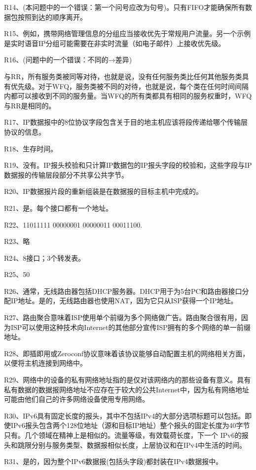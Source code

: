 \documentclass[11pt,UTF8,twoside]{article}
\begin{document}
	R14、(本问题中的一个错误：第一个问号应改为句号)。只有FIFO才能确保所有数据包按照到达的顺序离开。
	
	R15、例如，携带网络管理信息的分组应当接收优先于常规用户流量。另一个示例是实时语音IP分组可能需要在非实时流量（如电子邮件）上接收优先级。
	
	R16、(问题中的一个错误：不同的→差异)
	
	与RR，所有服务类被同等对待，也就是说，没有任何服务类比任何其他服务类具有优先级。对于WFQ，服务类被不同的对待，也就是说，每个类在任何时间间隔内都可以接收到不同的服务量。当WFQ的所有类都具有相同的服务权重时，WFQ与RR是相同的。
	
	R17、IP数据报中的8位协议字段包含关于目的地主机应该将段传递给哪个传输层协议的信息。
	
	R18、生存时间。
	
	R19、没有。IP报头校验和只计算IP数据包的IP报头字段的校验和，这些字段与IP数据报的传输层段部分不共享公共字节。
	
	R20、IP数据报片段的重新组装是在数据报的目标主机中完成的。
	
	R21、是。每个接口都有一个地址。
	
	R22、11011111 00000001 00000011 00011100. 
	
	R23、略
	
	R24、8接口；3个转发表。
	
	R25、50%
	
	R26、通常，无线路由器包括DHCP服务器。DHCP用于为5台PC和路由器接口分配IP地址。是的，无线路由器也使用NAT，因为它只从ISP获得一个IP地址。
	
	R27、路由聚合意味着ISP使用单个前缀为多个网络做广告。路由聚合很有用，因为ISP可以使用这种技术向Internet的其他部分宣传ISP拥有的多个网络的单一前缀地址。
	
	R28、即插即用或Zeroconf协议意味着该协议能够自动配置主机的网络相关方面，以便将主机连接到网络中。
	
	R29、网络中的设备的私有网络地址指的是仅对该网络内的那些设备有意义。具有私有数据的数据报网络地址不应存在于较大的公共Internet中，因为私有网络地址可能由他们自己的许多网络设备使用专用网络。
	
	R30、IPv6具有固定长度的报头，其中不包括IPv4的大部分选项标题可以包括。即使IPv6报头包含两个128位地址（源和目标IP地址）整个报头的固定长度为40字节只有。几个领域在精神上是相似的。流量等级，有效载荷长度，下一个 IPv6的报头和跳限分别与服务类型、数据报相似长度，上层协议和在IPv4中生活的时间。
	
	R31、是的，因为整个IPv6数据报(包括头字段)都封装在IPv4数据报中。
	
\end{document}
